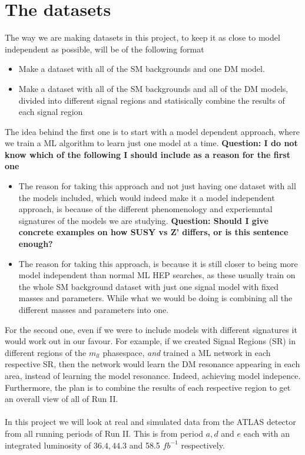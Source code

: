 \documentclass[12pt, a4paper]{book}
\begin{document}
\section{The datasets}
The way we are making datasets in this project, to keep it as close to model independent as possible, will be of the following format
\begin{itemize}
   \item Make a dataset with all of the SM backgrounds and one DM model.
   \item Make a dataset with all of the SM backgrounds and all of the DM models, divided into different signal regions and statisically combine the results of each signal region
\end{itemize}
The idea behind the first one is to start with a model dependent approach, where we train a ML algorithm to learn just one model at a time. \textbf{Question: I do not know which of the following I should include as a reason for the first one} 
\begin{itemize}
   \item The reason for taking this approach and not just having one dataset with all the models included, which would indeed make it 
   a model independent approach, is because of the different phenomenology and experiemntal signatures of the models we are studying. \textbf{Question: Should I give concrete examples on how SUSY vs Z' differs, or is this sentence enough?} 
   \item The reason for taking this approach, is because it is still closer to being more model independent than normal ML HEP searches, as these usually train on the whole SM background dataset with just one signal model with fixed masses and parameters. While what we would 
   be doing is combining all the different masses and parameters into one.   
\end{itemize}
For the second one, even if we were to include models with different signatures it would work out in our favour. For example, if we created Signal Regions (SR) in different regions of the $m_{ll}$ phasespace, \textit{and} trained a ML network in each respective SR, 
then the network would learn the DM resonance appearing in each area, instead of learning the model resonance. Indeed, achieving model indepence. Furthermore, the plan is to combine the results of each respective region to get an overall view of all of Run II.\\
\\In this project we will look at real and simulated data from the ATLAS detector from all running periods of Run II. This is from period $a, d$ and $e$ each with an integrated luminosity of $36.4, 44.3$ and 58.5 $fb^{-1}$ respectively. 
\end{document}
